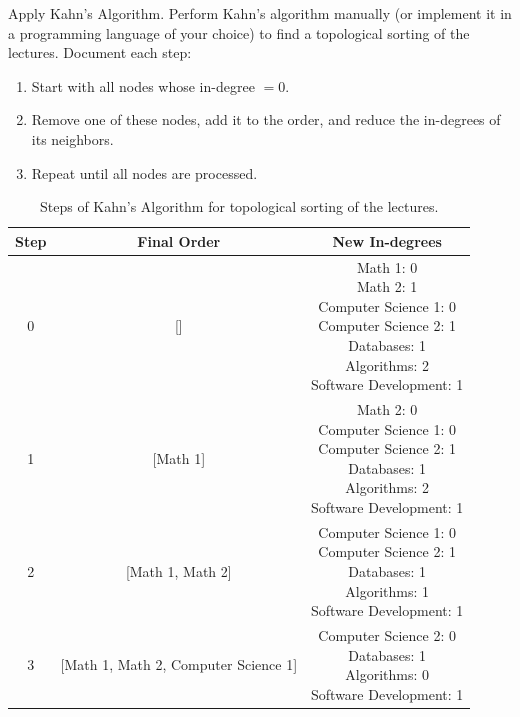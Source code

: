 \begin{ejercicio}
    Apply Kahn's Algorithm. Perform Kahn's algorithm manually (or implement it in a programming language of your choice) to find a topological sorting of the lectures. Document each step:
    \begin{enumerate}
        \item Start with all nodes whose in-degree $= 0$.
        \item Remove one of these nodes, add it to the order, and reduce the in-degrees of its neighbors.
        \item Repeat until all nodes are processed.
    \end{enumerate}
    \begin{table}
        \centering
        \caption{Steps of Kahn's Algorithm for topological sorting of the lectures.}
        \label{tab:kahnSteps}
    \begin{tabular}{c|c|c}
        \textbf{Step} & \textbf{Final Order} & \textbf{New In-degrees} \\
        \hline
        0 & [] & \makecell{Math 1: 0 \\ Math 2: 1 \\ Computer Science 1: 0 \\ Computer Science 2: 1 \\ Databases: 1 \\ Algorithms: 2 \\ Software Development: 1}\\ \hline
        1 & [Math 1] & \makecell{Math 2: 0 \\ Computer Science 1: 0 \\ Computer Science 2: 1 \\ Databases: 1 \\ Algorithms: 2 \\ Software Development: 1}\\ \hline
        2 & [Math 1, Math 2] & \makecell{Computer Science 1: 0 \\ Computer Science 2: 1 \\ Databases: 1 \\ Algorithms: 1 \\ Software Development: 1}\\ \hline
        3 & [Math 1, Math 2, Computer Science 1] & \makecell{Computer Science 2: 0 \\ Databases: 1 \\ Algorithms: 0 \\ Software Development: 1}\\ \hline

\end{tabular}
\end{table}
\end{ejercicio}
